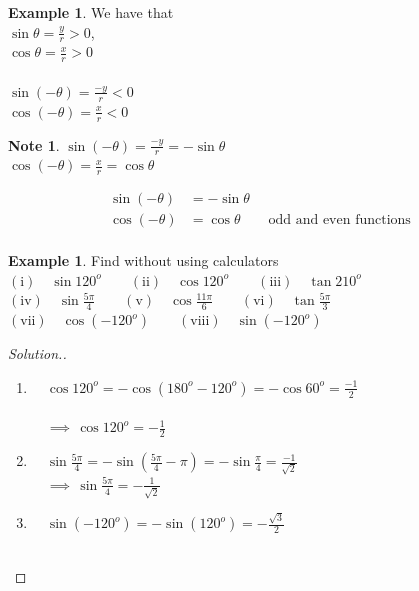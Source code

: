 \documentclass[11pt,a4paper]{article}
\theoremstyle{definition}
\newtheorem{example}[thm]{Example}
\newtheorem{note}[thm]{Note}
\newenvironment{solution}
  {\renewcommand{\qedsymbol}{}\begin{proof}[\textit{Solution}.]}
  {\end{proof}}
\begin{document}
\begin{example}
We have that\\

$\sin \theta = \frac{y}{r} > 0$,\\

$\cos \theta = \frac{x}{r} > 0$\\\\

$\sin (-\theta) = \frac{-y}{r}< 0$\\

$\cos (-\theta) = \frac{x}{r} < 0$\
\end{example}
\begin{note}

$\sin (-\theta) = \frac{-y}{r} = -\sin \theta$\\

$\cos (-\theta) = \frac{x}{r} = \cos \theta$

\begin{align*}
\sin (-\theta) & = - \sin \theta\\
\cos (-\theta) & = \cos \theta\qquad  \text{odd and even functions}\\
\end{align*}
\end{note}
\begin{example}

Find without using calculators\\

$(\text{i})\quad  \sin 120^o\qquad  (\text{ii})\quad  \cos 120^o\qquad  (\text{iii})\quad  \tan 210^o$\\

$(\text{iv})\quad  \sin \frac{5\pi}{4}\qquad  (\text{v})\quad  \cos \frac{11\pi}{6}\qquad  (\text{vi})\quad  \tan \frac{5\pi}{3}$\\

$(\text{vii})\quad  \cos (- 120^o)\qquad  (\text{viii})\quad  \sin (- 120^o)\qquad $
\end{example}
\begin{solution}

\begin{enumerate}
\item[ii.] $\quad  \cos 120^o = - \cos (180^o - 120^o ) = - \cos 60^o = \frac{-1}{2}$\\\\
       $\quad  \implies\, \cos 120^o = -\frac{1}{2}$\\



\item[iv.] $\quad  \sin \frac{5\pi}{4} = - \sin \left(\frac{5\pi}{4}-\pi\right)  = - \sin \frac{\pi}{4} = \frac{-1}{\sqrt{2}}$\\

$\quad  \implies \, \sin \frac{5\pi}{4} = -\frac{1}{\sqrt{2}}$\\


\item[viii.] $\quad  \sin (-120^o) = -\sin (120^o) = -\frac{\sqrt{3}}{2}$\\\\
\end{enumerate}
\end{solution}
\end{document}
